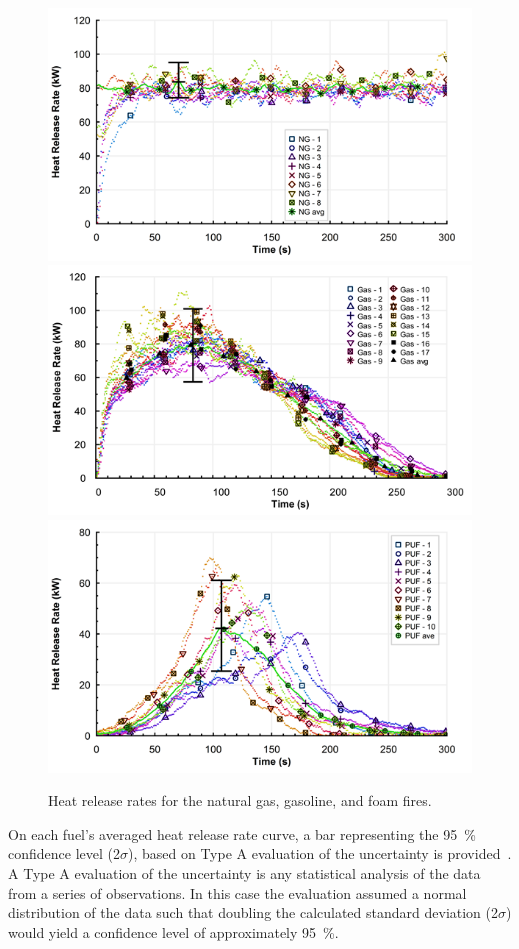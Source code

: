 \documentclass[twoside]{uocthesis}
\begin{document}
{{\begin{figure}[p]
  \centering
  \includegraphics[width=4.5in]{../Figures/Fig3}\\
  \includegraphics[width=4.5in]{../Figures/Fig4}\\
  \includegraphics[width=4.5in]{../Figures/Fig5}\\
  \caption[Heat release rates for the natural gas, gasoline and foam fires]{Heat release rates for the natural gas, gasoline, and foam fires.}
  \label{HRR}
\end{figure}

On each fuel’s averaged heat release rate curve, a bar representing the 95~\% confidence level (2$\sigma$), based on Type A evaluation of the uncertainty is provided~\cite{Taylor:1994}.  A Type A evaluation of the uncertainty is any statistical analysis of the data from a series of observations.  In this case the evaluation assumed a normal distribution of the data such that doubling the calculated standard deviation (2$\sigma$) would yield a confidence level of approximately 95~\%.

}}
\end{document}
